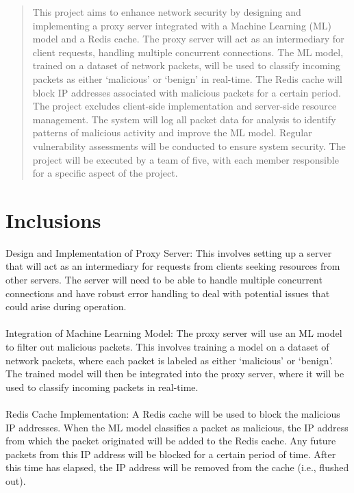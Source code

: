\begin{abstract}
This project aims to enhance network security by designing and implementing a proxy server integrated with a Machine Learning (ML) model and a Redis cache. The proxy server will act as an intermediary for client requests, handling multiple concurrent connections. The ML model, trained on a dataset of network packets, will be used to classify incoming packets as either ‘malicious’ or ‘benign’ in real-time. The Redis cache will block IP addresses associated with malicious packets for a certain period. The project excludes client-side implementation and server-side resource management. The system will log all packet data for analysis to identify patterns of malicious activity and improve the ML model. Regular vulnerability assessments will be conducted to ensure system security. The project will be executed by a team of five, with each member responsible for a specific aspect of the project. 
\end{abstract}


 \section{Inclusions}
Design and Implementation of Proxy Server: This involves setting up a server that will act as an intermediary for requests from clients seeking resources from other servers. The server will need to be able to handle multiple concurrent connections and have robust error handling to deal with potential issues that could arise during operation.
\\\\
\indent Integration of Machine Learning Model: The proxy server will use an ML model to filter out malicious packets. This involves training a model on a dataset of network packets, where each packet is labeled as either ‘malicious’ or ‘benign’. The trained model will then be integrated into the proxy server, where it will be used to classify incoming packets in real-time.
\\\\
\indent Redis Cache Implementation: A Redis cache will be used to block the malicious IP addresses. When the ML model classifies a packet as malicious, the IP address from which the packet originated will be added to the Redis cache. Any future packets from this IP address will be blocked for a certain period of time. After this time has elapsed, the IP address will be removed from the cache (i.e., flushed out).


